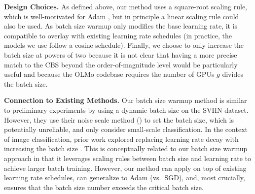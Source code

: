 \documentclass{article}
\renewcommand{\paragraph}[1]{\noindent \textbf{#1}}
\begin{document}
\paragraph{Design Choices.} As defined above, our method uses a square-root scaling rule, which is well-motivated for Adam \citep{malladi2022sdes}, but in principle a linear scaling rule could also be used.
As batch size warmup only modifies the base learning rate, it is compatible to overlay with existing learning rate schedules (in practice, the models we use follow a cosine schedule).
Finally, we choose to only increase the batch size at powers of two because it is not clear that having a more precise match to the CBS beyond the order-of-magnitude level would be particularly useful and because the OLMo codebase requires the number of GPUs $g$ divides the batch size.

\paragraph{Connection to Existing Methods.}
Our batch size warmup method is similar to preliminary experiments by \citet[Appendix D]{mccandlish2018empirical} using a dynamic batch size on the SVHN dataset. However, they use their noise scale method () to set the batch size, which is potentially unreliable, and only consider small-scale classification.
In the context of image classification, prior work explored replacing learning rate decay with increasing the batch size \citep{smith-2018-decay}.
This is conceptually related to our batch size warmup approach in that it leverages scaling rules between batch size and learning rate to achieve larger batch training.
However, our method can apply on top of existing learning rate schedules, can generalize to Adam (vs.~SGD), and, most crucially, ensures that the batch size number exceeds the critical batch size.
\end{document}
